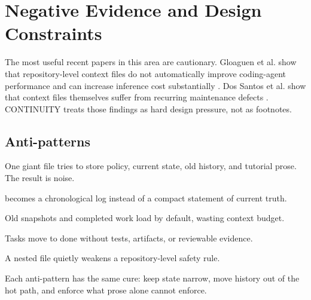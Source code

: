 
\section{Negative Evidence and Design Constraints}



The most useful recent papers in this area are cautionary. Gloaguen et al. show that repository-level context files do not automatically improve coding-agent performance and can increase inference cost substantially \cite{Gloaguen2026Agents}. Dos Santos et al. show that context files themselves suffer from recurring maintenance defects \cite{DosSantos2026Smells}. CONTINUITY treats those findings as hard design pressure, not as footnotes.



\subsection{Anti-patterns}

 One giant file tries to store policy, current state, old history, and tutorial prose. The result is noise.

  becomes a chronological log instead of a compact statement of current truth.

 Old snapshots and completed work load by default, wasting context budget.

 Tasks move to done without tests, artifacts, or reviewable evidence.

 A nested file quietly weakens a repository-level safety rule.

Each anti-pattern has the same cure: keep state narrow, move history out of the hot path, and enforce what prose alone cannot enforce.
